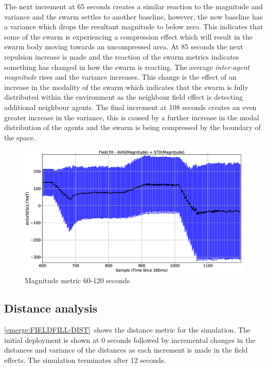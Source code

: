 The next increment at 65 seconds creates a similar reaction to the magnitude and variance and the swarm settles to another baseline, however, the new baseline has a variance which drops the resultant magnitude to below zero. This indicates that some of the swarm is experiencing a compression effect which will result in the swarm body moving towards an uncompressed area. At 85 seconds the next repulsion increase is made and the reaction of the swarm metrics indicates something has changed in how the swarm is reacting. The average \textit{inter-agent magnitude} rises and the variance increases. This change is the effect of an increase in the modality of the swarm which indicates that the swarm is fully distributed within the environment as the neighbour field effect is detecting additional neighbour agents. The final increment at 108 seconds creates an even greater increase in the variance, this is caused by a further increase in the modal distribution of the agents and the swarm is being compressed by the boundary of the space.

\begin{figure}[H]
\begin{center}
\includegraphics[width=12cm]{CHAPTER-8/figures/FIELDFILL-MAG-2}
\end{center}
\caption{Magnitude metric 60-120 seconds\label{emerge:FIELDFILL-MAG-2}}
\end{figure}

\subsection{Distance analysis}
\autoref{emerge:FIELDFILL-DIST}~shows the distance metric for the simulation. The initial deployment is shown at 0 seconds followed by incremental changes in the distances and variance of the distances as each increment is made in the field effects. The simulation terminates after 12 seconds.

